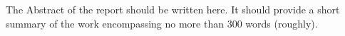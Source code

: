 \begin{center}
   The Abstract of the report should be written here. It should provide a short summary of the work encompassing no more than 300 words (roughly). 
\end{center}

